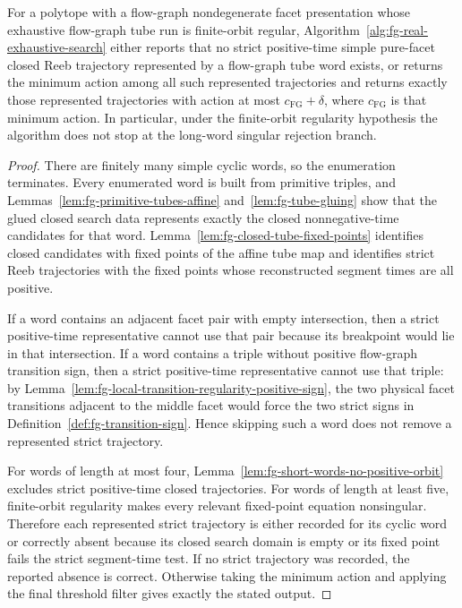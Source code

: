 \begin{unverified}
\begin{proposition}%
\label{prop:fg-real-search-correctness}
For a polytope with a flow-graph nondegenerate facet presentation whose
exhaustive flow-graph tube run is finite-orbit regular,
Algorithm~\ref{alg:fg-real-exhaustive-search} either reports that no strict
positive-time simple pure-facet closed Reeb trajectory represented by a flow-graph tube
word exists, or returns the minimum action among all such represented
trajectories and returns exactly those represented trajectories with action at
most \(c_{\mathrm{FG}}+\delta\), where \(c_{\mathrm{FG}}\) is that minimum
action.
In particular, under the finite-orbit regularity hypothesis the algorithm does
not stop at the long-word singular rejection branch.
\end{proposition}

\begin{proof}
There are finitely many simple cyclic words, so the enumeration terminates.
Every enumerated word is built from primitive triples, and
Lemmas~\ref{lem:fg-primitive-tubes-affine} and~\ref{lem:fg-tube-gluing} show
that the glued closed search data represents exactly the closed
nonnegative-time candidates for that word.  Lemma~\ref{lem:fg-closed-tube-fixed-points}
identifies closed candidates with fixed points of the affine tube map and
identifies strict Reeb trajectories with the fixed points whose reconstructed
segment times are all positive.

If a word contains an adjacent facet pair with empty intersection, then a
strict positive-time representative cannot use that pair because its breakpoint
would lie in that intersection.  If a word contains a triple without positive
flow-graph transition sign, then a strict positive-time representative cannot
use that triple: by
Lemma~\ref{lem:fg-local-transition-regularity-positive-sign}, the two physical
facet transitions adjacent to the middle facet would force the two strict signs
in Definition~\ref{def:fg-transition-sign}.  Hence skipping such a word does
not remove a represented strict trajectory.

For words of length at most four, Lemma~\ref{lem:fg-short-words-no-positive-orbit}
excludes strict positive-time closed trajectories.  For words of length at
least five, finite-orbit regularity makes every relevant fixed-point equation
nonsingular.  Therefore each represented strict trajectory is either recorded
for its cyclic word or correctly absent because its closed search domain is
empty or its fixed point fails the strict segment-time test.  If no strict
trajectory was recorded, the reported absence is correct.  Otherwise taking the
minimum action and applying the final threshold filter gives exactly the stated
output.
\end{proof}
\end{unverified}


